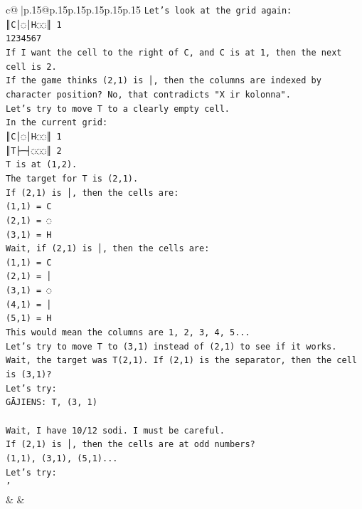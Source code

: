 \documentclass{article}
\begin{document}
{\begin{supertabular}{c@{$\;$}|p{.15\linewidth}@{}p{.15\linewidth}p{.15\linewidth}p{.15\linewidth}p{.15\linewidth}p{.15\linewidth}}
{{{\texttt{Let's look at the grid again:} \\
\texttt{║C│◌│H◌◌║ 1} \\
\texttt{1234567} \\
\texttt{If I want the cell to the right of C, and C is at 1, then the next cell is 2.} \\
\texttt{If the game thinks (2,1) is │, then the columns are indexed by character position? No, that contradicts "X ir kolonna".} \\
\texttt{Let's try to move T to a clearly empty cell.} \\
\texttt{In the current grid:} \\
\texttt{║C│◌│H◌◌║ 1} \\
\texttt{║T├─┤◌◌◌║ 2} \\
\texttt{T is at (1,2).} \\
\texttt{The target for T is (2,1).} \\
\texttt{If (2,1) is │, then the cells are:} \\
\texttt{(1,1) = C} \\
\texttt{(2,1) = ◌} \\
\texttt{(3,1) = H} \\
\texttt{Wait, if (2,1) is │, then the cells are:} \\
\texttt{(1,1) = C} \\
\texttt{(2,1) = │} \\
\texttt{(3,1) = ◌} \\
\texttt{(4,1) = │} \\
\texttt{(5,1) = H} \\
\texttt{This would mean the columns are 1, 2, 3, 4, 5...} \\
\texttt{Let's try to move T to (3,1) instead of (2,1) to see if it works.} \\
\texttt{Wait, the target was T(2,1). If (2,1) is the separator, then the cell is (3,1)?} \\
\texttt{Let's try:} \\
\texttt{GĀJIENS: T, (3, 1)} \\
\\ 
\texttt{Wait, I have 10/12 sodi. I must be careful.} \\
\texttt{If (2,1) is │, then the cells are at odd numbers?} \\
\texttt{(1,1), (3,1), (5,1)...} \\
\texttt{Let's try:} \\
\texttt{'} \\
            }
        }
    }
    & & \\ \\


\end{supertabular}}
\end{document}
